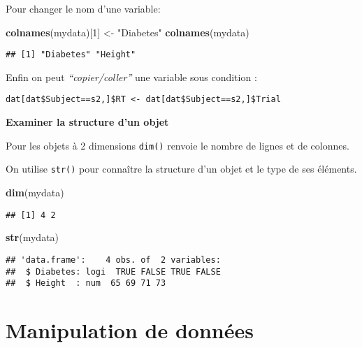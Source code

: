 \documentclass[]{book}
\newenvironment{Shaded}{\begin{snugshade}}{\end{snugshade}}
\newcommand{\DecValTok}[1]{\textcolor[rgb]{0.00,0.00,0.81}{#1}}
\newcommand{\KeywordTok}[1]{\textcolor[rgb]{0.13,0.29,0.53}{\textbf{#1}}}
\newcommand{\NormalTok}[1]{#1}
\newcommand{\StringTok}[1]{\textcolor[rgb]{0.31,0.60,0.02}{#1}}
\begin{document}
Pour changer le nom d'une variable:

\begin{Shaded}
\begin{Highlighting}[]
\KeywordTok{colnames}\NormalTok{(mydata)[}\DecValTok{1}\NormalTok{] <-}\StringTok{ "Diabetes"}
\KeywordTok{colnames}\NormalTok{(mydata)}
\end{Highlighting}
\end{Shaded}

\begin{verbatim}
## [1] "Diabetes" "Height"
\end{verbatim}

Enfin on peut \emph{``copier/coller''} une variable sous condition :

\texttt{dat{[}dat\$Subject==\textquotesingle{}s2\textquotesingle{},{]}\$RT\ \textless{}-\ dat{[}dat\$Subject==\textquotesingle{}s2\textquotesingle{},{]}\$Trial}

\textbf{Examiner la structure d'un objet}

Pour les objets à 2 dimensions \texttt{dim()} renvoie le nombre de lignes et de colonnes.

On utilise \texttt{str()} pour connaître la structure d'un objet et le type de ses éléments.

\begin{Shaded}
\begin{Highlighting}[]
\KeywordTok{dim}\NormalTok{(mydata)}
\end{Highlighting}
\end{Shaded}

\begin{verbatim}
## [1] 4 2
\end{verbatim}

\begin{Shaded}
\begin{Highlighting}[]
\KeywordTok{str}\NormalTok{(mydata)}
\end{Highlighting}
\end{Shaded}

\begin{verbatim}
## 'data.frame':    4 obs. of  2 variables:
##  $ Diabetes: logi  TRUE FALSE TRUE FALSE
##  $ Height  : num  65 69 71 73
\end{verbatim}

\hypertarget{manipulation-de-donnees-1}{%
\section{Manipulation de données}\label{manipulation-de-donnees-1}}
\end{document}
